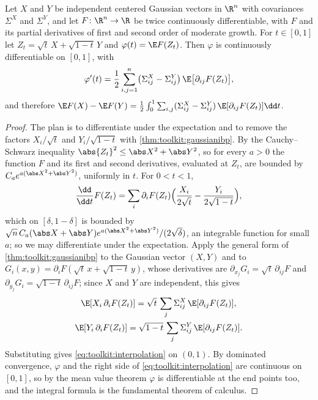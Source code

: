 \begin{refsection}
\begin{lemma}\label{lem:toolkit:interpolation}
Let $X$ and $Y$ be independent centered Gaussian vectors in $\R^n$ with covariances $\Sigma^X$ and $\Sigma^Y$, and let $F\colon\R^n\to\R$ be twice continuously differentiable, with $F$ and its partial derivatives of first and second order of moderate growth. For $t\in[0,1]$ let $Z_t=\sqrt t\,X+\sqrt{1-t}\,Y$ and $\varphi(t)=\E F(Z_t)$. Then $\varphi$ is continuously differentiable on $[0,1]$, with
\begin{equation}\label{eq:toolkit:interpolation}
\varphi'(t)=\frac12\sum_{i,j=1}^n\bigl(\Sigma^X_{ij}-\Sigma^Y_{ij}\bigr)\,\E\bigl[\partial_{ij}F(Z_t)\bigr],
\end{equation}
and therefore $\E F(X)-\E F(Y)=\frac12\int_0^1\sum_{i,j}(\Sigma^X_{ij}-\Sigma^Y_{ij})\,\E[\partial_{ij}F(Z_t)]\dd t$.
\end{lemma}

\begin{proof}
The plan is to differentiate under the expectation and to remove the factors $X_i/\sqrt t$ and $Y_i/\sqrt{1-t}$ with \cref{thm:toolkit:gaussianibp}. By the Cauchy--Schwarz inequality $\abs{Z_t}^2\le\abs X^2+\abs Y^2$, so for every $a>0$ the function $F$ and its first and second derivatives, evaluated at $Z_t$, are bounded by $C_ae^{a(\abs X^2+\abs Y^2)}$, uniformly in $t$. For $0<t<1$,
\[
\frac{\dd}{\dd t}F(Z_t)=\sum_i\partial_iF(Z_t)\Bigl(\frac{X_i}{2\sqrt t}-\frac{Y_i}{2\sqrt{1-t}}\Bigr),
\]
which on $[\delta,1-\delta]$ is bounded by $\sqrt n\,C_a(\abs X+\abs Y)e^{a(\abs X^2+\abs Y^2)}/(2\sqrt\delta)$, an integrable function for small $a$; so we may differentiate under the expectation. Apply the general form of \cref{thm:toolkit:gaussianibp} to the Gaussian vector $(X,Y)$ and to $G_i(x,y)=\partial_iF(\sqrt t\,x+\sqrt{1-t}\,y)$, whose derivatives are $\partial_{x_j}G_i=\sqrt t\,\partial_{ij}F$ and $\partial_{y_j}G_i=\sqrt{1-t}\,\partial_{ij}F$; since $X$ and $Y$ are independent, this gives
\begin{gather*}
\E[X_i\,\partial_iF(Z_t)]=\sqrt t\,\sum_j\Sigma^X_{ij}\,\E[\partial_{ij}F(Z_t)],\\
\E[Y_i\,\partial_iF(Z_t)]=\sqrt{1-t}\,\sum_j\Sigma^Y_{ij}\,\E[\partial_{ij}F(Z_t)].
\end{gather*}
Substituting gives \eqref{eq:toolkit:interpolation} on $(0,1)$. By dominated convergence, $\varphi$ and the right side of \eqref{eq:toolkit:interpolation} are continuous on $[0,1]$, so by the mean value theorem $\varphi$ is differentiable at the end points too, and the integral formula is the fundamental theorem of calculus.
\end{proof}


\end{refsection}
